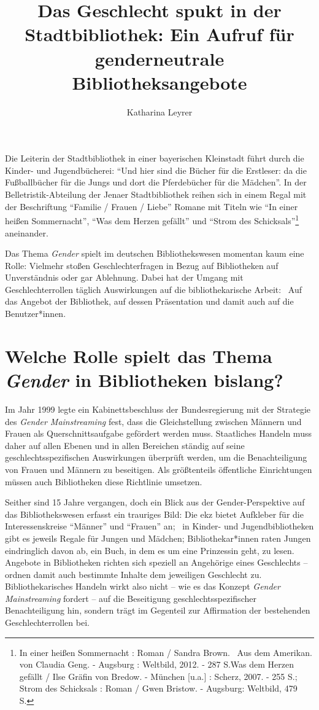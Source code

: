 \documentclass[a4paper,
fontsize=11pt,
oneside,
numbers=noperiodatend,
parskip=half-,
bibliography=totoc,
final
]{scrartcl}
\title{\LARGE{Das Geschlecht spukt in der Stadtbibliothek: Ein Aufruf für genderneutrale Bibliotheksangebote}} %
\author{Katharina Leyrer} %
\date{}
\begin{document}
\maketitle
\thispagestyle{fancyplain} 


Die Leiterin der Stadtbibliothek in einer bayerischen Kleinstadt führt
durch die Kinder- und Jugendbücherei: \enquote{Und hier sind die Bücher
für die Erstleser: da die Fußballbücher für die Jungs und dort die
Pferdebücher für die Mädchen}. In der Belletristik-Abteilung der Jenaer
Stadtbibliothek reihen sich in einem Regal mit der Beschriftung
\enquote{Familie / Frauen / Liebe} Romane mit Titeln wie \enquote{In
einer heißen Sommernacht}, \enquote{Was dem Herzen gefällt} und
\enquote{Strom des Schicksals}\footnote{In einer heißen Sommernacht :
  Roman / Sandra Brown.~ Aus dem Amerikan. von Claudia Geng. - Augsburg
  : Weltbild, 2012. - 287 S.Was dem Herzen gefällt / Ilse Gräfin von
  Bredow. - München {[}u.a.{]} : Scherz, 2007. - 255 S.; Strom des
  Schicksals : Roman / Gwen Bristow. - Augsburg: Weltbild, 479 S.}
aneinander.

Das Thema \emph{Gender} spielt im deutschen Bibliothekswesen momentan
kaum eine Rolle: Vielmehr stoßen Geschlechterfragen in Bezug auf
Bibliotheken auf Unverständnis oder gar Ablehnung. Dabei hat der Umgang
mit Geschlechterrollen täglich Auswirkungen auf die bibliothekarische
Arbeit:~ Auf das Angebot der Bibliothek, auf dessen Präsentation und
damit auch auf die Benutzer*innen.

\section*{Welche Rolle spielt das Thema \emph{Gender} in
Bibliotheken
bislang?}\label{welche-rolle-spielt-das-thema-gender-in-bibliotheken-bislang}

Im Jahr 1999 legte ein Kabinettsbeschluss der Bundesregierung mit der
Strategie des \emph{Gender Mainstreaming} fest, dass die Gleichstellung
zwischen Männern und Frauen als Querschnittsaufgabe gefördert werden
muss. Staatliches Handeln muss daher auf allen Ebenen und in allen
Bereichen ständig auf seine geschlechtsspezifischen Auswirkungen
überprüft werden, um die Benachteiligung von Frauen und Männern zu
beseitigen. Als größtenteils öffentliche Einrichtungen müssen auch
Bibliotheken diese Richtlinie umsetzen.

Seither sind 15 Jahre vergangen, doch ein Blick aus der
Gender-Perspektive auf das Bibliothekswesen erfasst ein trauriges Bild:
Die ekz bietet Aufkleber für die Interessenskreise \enquote{Männer} und
\enquote{Frauen} an;~ in Kinder- und Jugendbibliotheken gibt es jeweils
Regale für Jungen und Mädchen; Bibliothekar*innen raten Jungen
eindringlich davon ab, ein Buch, in dem es um eine Prinzessin geht, zu
lesen. Angebote in Bibliotheken richten sich speziell an Angehörige
eines Geschlechts -- ordnen damit auch bestimmte Inhalte dem jeweiligen
Geschlecht zu. Bibliothekarisches Handeln wirkt also nicht -- wie es das
Konzept \emph{Gender Mainstreaming} fordert -- auf die Beseitigung
geschlechtsspezifischer Benachteiligung hin, sondern trägt im Gegenteil
zur Affirmation der bestehenden Geschlechterrollen bei.
\end{document}

